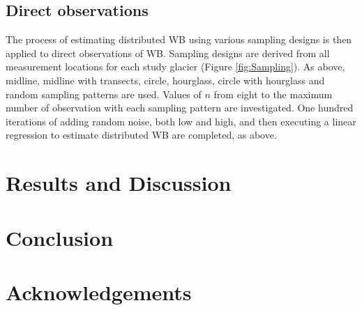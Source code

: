\documentclass[twocolumn,letterpaper]{igs}
\begin{document}
\subsection{Direct observations}

The process of estimating distributed WB using various sampling designs is then applied to direct observations of WB. Sampling designs are derived from all measurement locations for each study glacier (Figure \ref{fig:Sampling}). As above, midline, midline with transects, circle, hourglass, circle with hourglass and random sampling patterns are used. Values of $n$ from eight to the maximum number of observation with each sampling pattern are investigated. One hundred iterations of adding random noise, both low and high, and then executing a linear regression to estimate distributed WB are completed, as above. 

\section{Results and Discussion}

%
%
%
%
%
%

\section{Conclusion}


\section{Acknowledgements}
\end{document}
